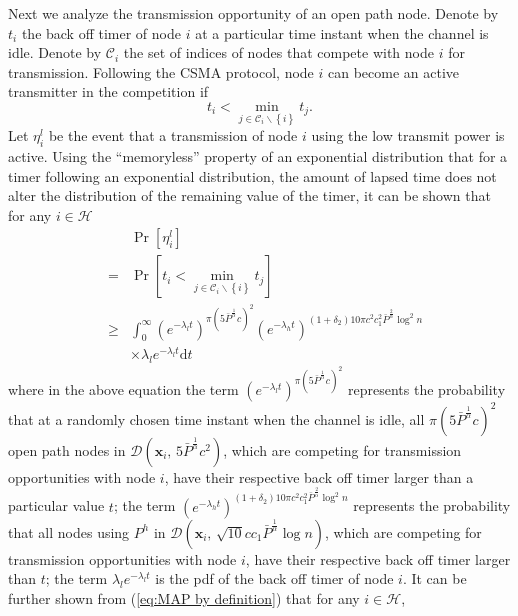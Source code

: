 \documentclass[english]{IEEEtran}
\theoremstyle{plain}
\theoremstyle{plain}
\theoremstyle{plain}
\theoremstyle{remark}
\begin{document}
Next we analyze the transmission opportunity of an open path node.
Denote by $t_{i}$ the back off timer of node $i$ at a particular
time instant when the channel is idle. Denote by $\mathcal{C}_{i}$
the set of indices of nodes that compete with node $i$ for transmission.
Following the CSMA protocol, node $i$ can become an active transmitter
in the competition if 
\[
t_{i}<\min_{j\in\mathcal{C}_{i}\backslash\left\{ i\right\} }t_{j}.
\]
Let $\eta_{i}^{l}$ be the event that a transmission of node $i$
using the low transmit power is active. Using the ``memoryless''
property of an exponential distribution that for a timer following
an exponential distribution, the amount of lapsed time does not alter
the distribution of the remaining value of the timer, it can be shown
that for any $i\in\mathcal{H}$
\begin{eqnarray}
 &  & \Pr\left[\eta_{i}^{l}\right]\nonumber \\
 & = & \Pr\left[t_{i}<\min_{j\in\mathcal{C}_{i}\backslash\left\{ i\right\} }t_{j}\right]\nonumber \\
 & \geq & \int_{0}^{\infty}\left(e^{-\lambda_{l}t}\right)^{\pi\left(5\bar{P}^{\frac{1}{\alpha}}c\right)^{2}}\left(e^{-\lambda_{h}t}\right)^{\left(1+\delta_{2}\right)10\pi c^{2}c_{1}^{2}\bar{P}^{\frac{2}{\alpha}}\log^{2}n}\nonumber \\
 &  & \times\lambda_{l}e^{-\lambda_{l}t}\mathrm{d}t\label{eq:MAP by definition}
\end{eqnarray}
where in the above equation the term $\left(e^{-\lambda_{l}t}\right)^{\pi\left(5\bar{P}^{\frac{1}{\alpha}}c\right)^{2}}$
represents the probability that at a randomly chosen time instant
when the channel is idle, all $\pi\left(5\bar{P}^{\frac{1}{\alpha}}c\right)^{2}$
open path nodes in $\mathcal{D}\left(\boldsymbol{x}_{i},\,5\bar{P}^{\frac{1}{\alpha}}c^{2}\right)$,
which are competing for transmission opportunities with node $i$,
have their respective back off timer larger than a particular value
$t$; the term $\left(e^{-\lambda_{h}t}\right)^{\left(1+\delta_{2}\right)10\pi c^{2}c_{1}^{2}\bar{P}^{\frac{2}{\alpha}}\log^{2}n}$
represents the probability that all nodes using $P^{h}$ in $\mathcal{D}\left(\boldsymbol{x}_{i},\,\sqrt{10}cc_{1}\bar{P}^{\frac{1}{\alpha}}\log n\right)$,
which are competing for transmission opportunities with node $i$,
have their respective back off timer larger than $t$; the term $\lambda_{l}e^{-\lambda_{l}t}$
is the pdf of the back off timer of node $i$. It can be further shown
from (\ref{eq:MAP by definition}) that for any $i\in\mathcal{H}$,
\end{document}
